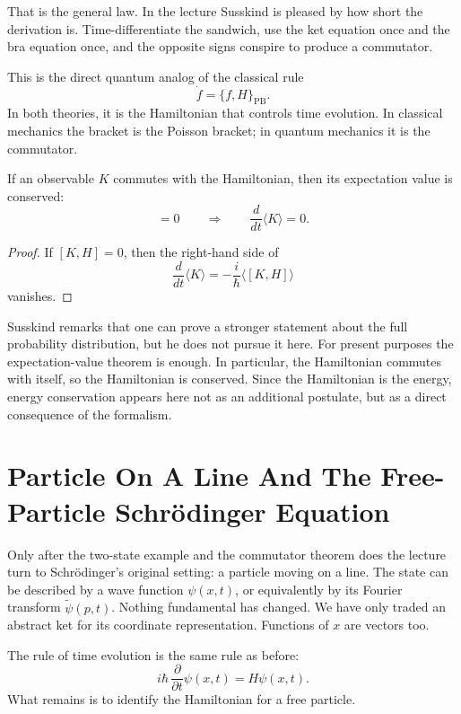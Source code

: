 That is the general law. In the lecture Susskind is pleased by how short the derivation is. Time-differentiate the sandwich, use the ket equation once and the bra equation once, and the opposite signs conspire to produce a commutator.

This is the direct quantum analog of the classical rule
\begin{equation}
\dot f=\{f,H\}_{\mathrm{PB}}.
\end{equation}
In both theories, it is the Hamiltonian that controls time evolution. In classical mechanics the bracket is the Poisson bracket; in quantum mechanics it is the commutator.

\begin{proposition}
If an observable $K$ commutes with the Hamiltonian, then its expectation value is conserved:
\begin{equation}
[K,H]=0
\qquad \Longrightarrow \qquad
\frac{d}{dt}\langle K\rangle=0.
\end{equation}
\end{proposition}

\begin{proof}
If $[K,H]=0$, then the right-hand side of
\[
\frac{d}{dt}\langle K\rangle
=
-\frac{i}{\hbar}\langle[K,H]\rangle
\]
vanishes.
\end{proof}

Susskind remarks that one can prove a stronger statement about the full probability distribution, but he does not pursue it here. For present purposes the expectation-value theorem is enough. In particular, the Hamiltonian commutes with itself, so the Hamiltonian is conserved. Since the Hamiltonian is the energy, energy conservation appears here not as an additional postulate, but as a direct consequence of the formalism.

\section{Particle On A Line And The Free-Particle Schr\"odinger Equation}

Only after the two-state example and the commutator theorem does the lecture turn to Schr\"odinger's original setting: a particle moving on a line. The state can be described by a wave function $\psi(x,t)$, or equivalently by its Fourier transform $\tilde\psi(p,t)$. Nothing fundamental has changed. We have only traded an abstract ket for its coordinate representation. Functions of $x$ are vectors too.

The rule of time evolution is the same rule as before:
\begin{equation}
i\hbar\,\frac{\partial}{\partial t}\psi(x,t)=H\psi(x,t).
\end{equation}
What remains is to identify the Hamiltonian for a free particle.

